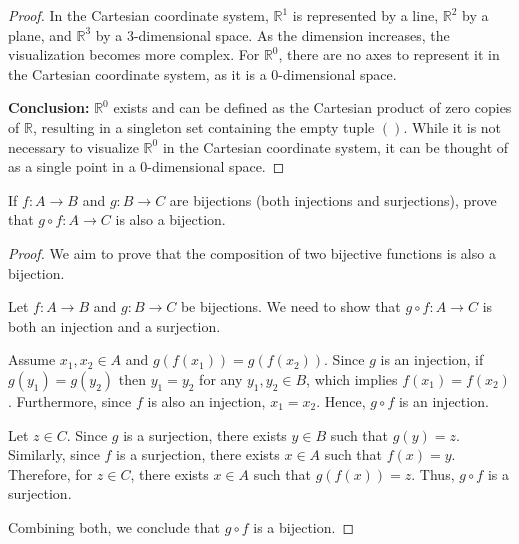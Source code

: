 \begin{proof}
	In the Cartesian coordinate system, $\mathbb{R}^1$ is represented by a line, $\mathbb{R}^2$ by a plane, and $\mathbb{R}^3$ by a 3-dimensional space. As the dimension increases, the visualization becomes more complex. For $\mathbb{R}^0$, there are no axes to represent it in the Cartesian coordinate system, as it is a 0-dimensional space.
	
	\textbf{Conclusion:}
	$\mathbb{R}^0$ exists and can be defined as the Cartesian product of zero copies of $\mathbb{R}$, resulting in a singleton set containing the empty tuple $()$. While it is not necessary to visualize $\mathbb{R}^0$ in the Cartesian coordinate system, it can be thought of as a single point in a 0-dimensional space.
\end{proof}

\begin{exercise}
	If $f:A\to B$ and $g:B\to C$ are bijections (both injections and surjections), prove that 
	$g\circ f:A\to C$ is also a bijection.
\end{exercise}
\begin{proof}
	We aim to prove that the composition of two bijective functions is also a bijection.

	Let \(f: A \to B\) and \(g: B \to C\) be bijections. We need to show that \(g \circ f: A \to C\) is both an injection and a surjection.

	Assume \(x_1, x_2 \in A\) and \(g(f(x_1)) = g(f(x_2))\). Since \(g\) is an injection, if \(g(y_1) = g(y_2)\) then \(y_1 = y_2\) for any \(y_1, y_2 \in B\), which implies \(f(x_1) = f(x_2)\). Furthermore, since \(f\) is also an injection, \(x_1 = x_2\). Hence, \(g \circ f\) is an injection.

	Let \(z \in C\). Since \(g\) is a surjection, there exists \(y \in B\) such that \(g(y) = z\). Similarly, since \(f\) is a surjection, there exists \(x \in A\) such that \(f(x) = y\). Therefore, for \(z \in C\), there exists \(x \in A\) such that \(g(f(x)) = z\). Thus, \(g \circ f\) is a surjection.

	Combining both, we conclude that \(g \circ f\) is a bijection.
\end{proof}

